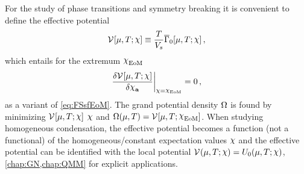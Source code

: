 For the study of phase transitions and symmetry breaking it is convenient to define the effective potential 
\begin{align}
	\VeffFArgs{\muT;\FSsf}\equiv\frac{T}{\spatialVolume{}} \FSeaa_0[\muT;\FSsf]\, ,
	\label{eq:VeffFdef}
\end{align}
which entails for the extremum $\FSsfEoM$ 
\begin{align}
	\eval[3]{\frac{\delta \VeffFArgs{\muT;\FSsf} }{\delta \FSmfd{\FSsf}{a}}}_{\FSsf=\FSsfEoM}=0\,,
	\label{eq:VeffFEoM}
\end{align}
as a variant of \cref{eq:FSsfEoM}.
The grand potential density $\Omega$ is found by minimizing $\VeffFArgs{\muT;\FSsf}$ \wrt{} $\FSsf$ and $\thermalGrandPotentialDensity(\muT)=\VeffFArgs{\muT;\FSsfEoM}$. When studying homogeneous condensation, the effective potential becomes a function (not a functional) of the homogeneous/constant expectation values $\FSsf$ and the effective potential can be identified with the local potential $\VeffArgs{\muT;\FSsf}=U_0(\muT;\FSsf)$, \cf{} \cref{chap:GN,chap:QMM} for explicit applications.

